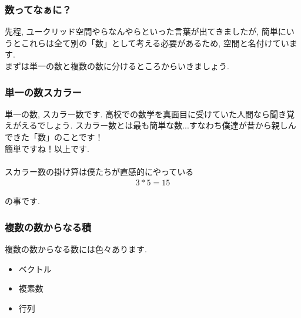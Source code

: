 \documentclass[11pt,a4paper]{jreport}
\begin{document}
\subsubsection{数ってなぁに？}
先程, ユークリッド空間やらなんやらといった言葉が出てきましたが, 簡単にいうとこれらは全て別の「数」として考える必要があるため, 空間と名付けています.\\
まずは単一の数と複数の数に分けるところからいきましょう.\\

\subsubsection{単一の数スカラー}
単一の数, スカラー数です. 高校での数学を真面目に受けていた人間なら聞き覚えがえるでしょう. スカラー数とは最も簡単な数...すなわち僕達が昔から親しんできた「数」のことです！\\
簡単ですね！以上です.\\
\\
スカラー数の掛け算は僕たちが直感的にやっている
\begin{eqnarray}
3 * 5 = 15
\end{eqnarray}

の事です.
\\

\subsubsection{複数の数からなる積}
複数の数からなる数には色々あります.\\
\begin{itemize}
 \item ベクトル
 \item 複素数
 \item 行列
\end{itemize}
\end{document}
